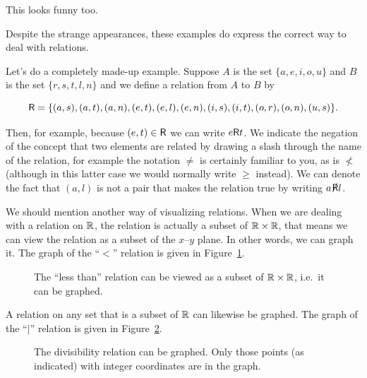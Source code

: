 \noindent This looks funny too.  

Despite the strange appearances, these 
examples do express the correct way to deal with relations.

Let's do a completely made-up example.  Suppose $A$ is the set
$\{a,e,i,o,u\}$ and $B$ is the set $\{r,s,t,l,n\}$ and we define 
a relation from $A$ to $B$ by

\[ \mbox{\textsf R} = \{ (a,s), (a,t), (a,n), (e,t), (e,l), (e,n), (i,s), (i,t), (o,r), (o,n), (u,s) \}. \]

Then, for example, because $(e,t) \in \mbox{\textsf R}$ we can write $e \mbox{\textsf R} t$.  We indicate the
negation of the concept that two elements are related by drawing a slash 
through the name of the relation, for example the notation $\neq$ is certainly
familiar to you, as is $\nless$ (although in this latter case we 
would normally write $\geq$ instead).  We can denote the fact that
$(a,l)$ is not a pair that makes the relation true by writing $a \nrelR l$.

We should mention another way of visualizing
relations.  When we are dealing with a relation on ${\mathbb R}$, the
relation is actually a subset of ${\mathbb R} \times {\mathbb R}$, that means 
we can view the relation as a subset of the $x$--$y$ plane.  In other 
words, we can graph it.  The graph of the ``$<$'' relation is
given in Figure~\ref{fig:lt_graph}.

\begin{figure}[!hbtp]
\begin{center}

\end{center}
\caption[The graph of the ``less than'' relation.]{The ``less than'' relation %
can be viewed as a subset of ${\mathbb R} \times {\mathbb R}$, i.e.\ it can be graphed.}
\label{fig:lt_graph} 
\end{figure}
  
A relation on any set that is a subset of ${\mathbb R}$ can likewise be
graphed.  The graph of the ``$\mid$'' relation is
given in Figure~\ref{fig:div_graph}.

\begin{figure}[!hbtp]
\begin{center}

\end{center}
\caption[The graph of the divisibility relation.]{The divisibility relation %
can be graphed.  Only those points (as indicated) with integer coordinates %
are in the graph.}
\label{fig:div_graph} 
\end{figure}
 
